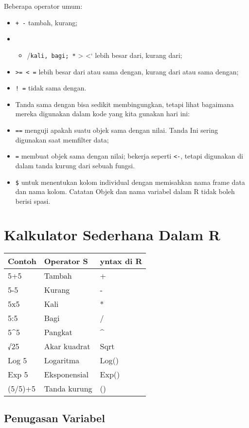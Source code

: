 \documentclass[
]{book}
\providecommand{\tightlist}{%
  \setlength{\itemsep}{0pt}\setlength{\parskip}{0pt}}
\begin{document}
Beberapa operator umum:

\begin{itemize}
\item
  \texttt{+\ -} tambah, kurang;
\item
  \begin{itemize}
  \tightlist
  \item
    /\texttt{kali,\ bagi;\ *} \textgreater{} \textless` lebih besar dari, kurang dari;
  \end{itemize}
\item
  \texttt{\textgreater{}=\ \textless{}\ =} lebih besar dari atau sama dengan, kurang dari atau sama dengan;
\item
  \texttt{!\ =} tidak sama dengan.
\item
  Tanda sama dengan bisa sedikit membingungkan, tetapi lihat bagaimana mereka digunakan dalam kode yang kita gunakan hari ini:
\item
  \texttt{==} menguji apakah suatu objek sama dengan nilai. Tanda Ini sering digunakan saat memfilter data;
\item
  \texttt{=} membuat objek sama dengan nilai; bekerja seperti \texttt{\textless{}-}, tetapi digunakan di dalam tanda kurung dari sebuah fungsi.
\item
  \texttt{\$} untuk menentukan kolom individual dengan memisahkan nama frame data dan nama kolom.
  Catatan Objek dan nama variabel dalam R tidak boleh berisi spasi.
\end{itemize}

\hypertarget{kalkulator-sederhana-dalam-r}{%
\section{Kalkulator Sederhana Dalam R}\label{kalkulator-sederhana-dalam-r}}

\begin{longtable}[]{@{}lll@{}}
\toprule
Contoh & Operator S & yntax di R\tabularnewline
\midrule
\endhead
5+5 & Tambah & +\tabularnewline
5-5 & Kurang & -\tabularnewline
5x5 & Kali & *\tabularnewline
5:5 & Bagi & /\tabularnewline
5\^{}5 & Pangkat & \^{}\tabularnewline
√25 & Akar kuadrat & Sqrt\tabularnewline
Log 5 & Logaritma & Log()\tabularnewline
Exp 5 & Eksponensial & Exp()\tabularnewline
(5/5)+5 & Tanda kurung & ()\tabularnewline
\bottomrule
\end{longtable}

\hypertarget{penugasan-variabel}{%
\subsection{Penugasan Variabel}\label{penugasan-variabel}}
\end{document}

